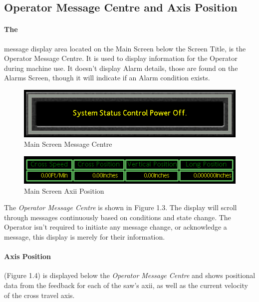 \subsection{Operator Message Centre and Axis Position}
\paragraph{The}message display area located on the Main Screen below the Screen Title, is the Operator Message Centre. It is used to display information for the Operator during machine use. It doesn't display Alarm details, those are found on the Alarms Screen, though it will indicate if an Alarm condition exists.
\begin{figure}
	\centering
	\includegraphics[width=.5\linewidth]{screen-captures/main/message-centre}
	\caption{Main Screen Message Centre}
	\label{fig:main-msg-cntr}
\end{figure}
\begin{figure}
	\centering
	\includegraphics[width=.5\linewidth]{screen-captures/main/main-axii-pos}
	\caption{Main Screen Axii Position}
	\label{fig:main-msg-cntr}
\end{figure}
The \textit{Operator Message Centre} is shown in Figure 1.3. The display will scroll through messages continuously based on conditions and state change. The Operator isn't required to initiate any message change, or acknowledge a message, this display is merely for their information.
\paragraph*{Axis Position}(Figure 1.4) is displayed below the \textit{Operator Message Centre} and shows positional data from the feedback for each of the saw's axii, as well as the current velocity of the cross travel axis.
\pagebreak

